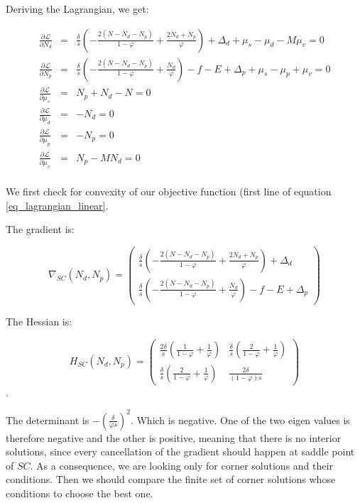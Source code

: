 \documentclass[english, a4paper]{article}
\theoremstyle{plain}
\theoremstyle{definition}
\theoremstyle{remark}
\begin{document}
Deriving the Lagrangian, we get:

\begin{eqnarray}
    \frac{\partial \mathcal{L}}{\partial N_d} & = & \frac{\delta}{s} \left( -\frac{2(N - N_d - N_p)}{1 - \varphi} + \frac{2N_d + N_p}{\varphi} \right) + \Delta_d + \mu_s - \mu_d - M \mu_v = 0\\
    \frac{\partial \mathcal{L}}{\partial N_p} & = & \frac{\delta}{s} \left( -\frac{2(N - N_d - N_p)}{1 - \varphi} + \frac{N_d}{\varphi} \right) -f-E + \Delta_p + \mu_s - \mu_p + \mu_v = 0\\
    \frac{\partial \mathcal{L}}{\partial \mu_s} & = & N_p + N_d - N = 0\\
    \frac{\partial \mathcal{L}}{\partial \mu_d} & = & -N_d = 0\\
    \frac{\partial \mathcal{L}}{\partial \mu_p} & = & -N_p = 0\\
    \frac{\partial \mathcal{L}}{\partial \mu_v} & = & N_p - MN_d = 0\\
\end{eqnarray}

We first check for convexity of our objective function (first line of equation \ref{eq_lagrangian_linear}.

The gradient is:

\begin{equation}
    \nabla_{SC} (N_d, N_p) = \begin{pmatrix}
        \frac{\delta}{s} \left( -\frac{2(N - N_d - N_p)}{1 - \varphi} + \frac{2N_d + N_p}{\varphi} \right) + \Delta_d\\
        \frac{\delta}{s} \left( -\frac{2(N - N_d - N_p)}{1 - \varphi} + \frac{N_d}{\varphi} \right) -f-E + \Delta_p
    \end{pmatrix}
\end{equation}

The Hessian is:

\begin{equation}
    H_{SC} (N_d, N_p) = \begin{pmatrix}
        \frac{2\delta}{s} \left( \frac{1}{1 - \varphi} + \frac{1}{\varphi} \right) & \frac{\delta}{s} \left( \frac{2}{1 - \varphi} + \frac{1}{\varphi} \right)\\
        \frac{\delta}{s} \left( \frac{2}{1 - \varphi}  + \frac{1}{\varphi} \right) & \frac{2\delta}{(1 - \varphi) s}
    \end{pmatrix}
\end{equation}.

The determinant is $-\left(\frac{\delta}{\varphi s}\right)^2$. Which is negative. One of the two eigen values is therefore negative and the other is positive, meaning that there is no interior solutions, since every cancellation of the gradient should happen at saddle point of $SC$. As a consequence, we are looking only for corner solutions and their conditions. Then we should compare the finite set of corner solutions whose conditions to choose the best one.
\end{document}

